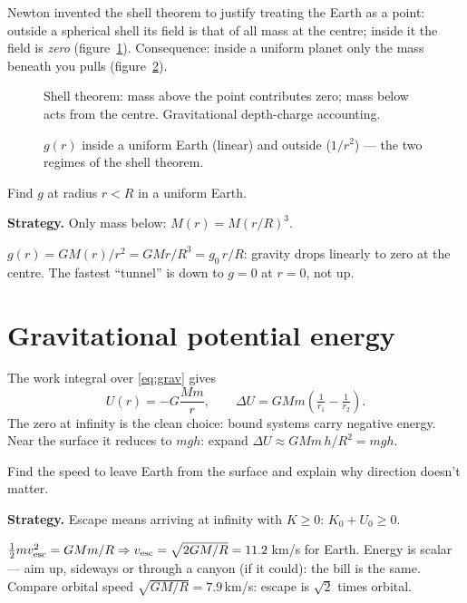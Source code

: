 Newton invented the shell theorem to justify treating the Earth as a
point: outside a spherical shell its field is that of all mass at the
centre; inside it the field is \emph{zero} (figure~\ref{fig:shell}).
Consequence: inside a uniform planet only the mass beneath you pulls
(figure~\ref{fig:gr}).

\begin{figure}[htbp]\centering

\caption{Shell theorem: mass above the point contributes zero; mass below
acts from the centre. Gravitational depth-charge accounting.}
\label{fig:shell}
\end{figure}

\begin{figure}[htbp]\centering

\caption{$g(r)$ inside a uniform Earth (linear) and outside
($1/r^{2}$) --- the two regimes of the shell theorem.}
\label{fig:gr}
\end{figure}

\begin{example}\label{ex:ginside}
Find $g$ at radius $r<R$ in a uniform Earth.
\par\smallskip
\textbf{Strategy.} Only mass below: $M(r)=M(r/R)^{3}$.
\begin{solution}
$g(r)=GM(r)/r^{2}=GM r/R^{3}=g_{0}\,r/R$: gravity drops linearly to zero
at the centre. The fastest ``tunnel'' is down to $g=0$ at $r=0$, not up.
\checkmark
\end{solution}
\end{example}

\section{Gravitational potential energy}\label{sec:grav-u}

The work integral over \eqref{eq:grav} gives
\begin{equation}
  U(r)=-G\frac{Mm}{r},\qquad \Delta U=GMm\!\left(\tfrac1{r_1}-\tfrac1{r_2}\right).
  \label{eq:ug}
\end{equation}
The zero at infinity is the clean choice: bound systems carry negative
energy. Near the surface it reduces to $mgh$: expand
$\Delta U\approx GMm\,h/R^{2}=mgh$.

\begin{example}\label{ex:escape}
Find the speed to leave Earth from the surface and explain why direction
doesn't matter.
\par\smallskip
\textbf{Strategy.} Escape means arriving at infinity with $K\ge0$:
$K_0+U_0\ge0$.
\begin{solution}
$\tfrac12mv_{\rm esc}^{2}=GMm/R \Rightarrow
v_{\rm esc}=\sqrt{2GM/R}=11.2$\,km/s for Earth. Energy is scalar ---
aim up, sideways or through a canyon (if it could): the bill is the same.
Compare orbital speed $\sqrt{GM/R}=7.9$\,km/s: escape is
$\sqrt2$ times orbital. \checkmark
\end{solution}
\end{example}

